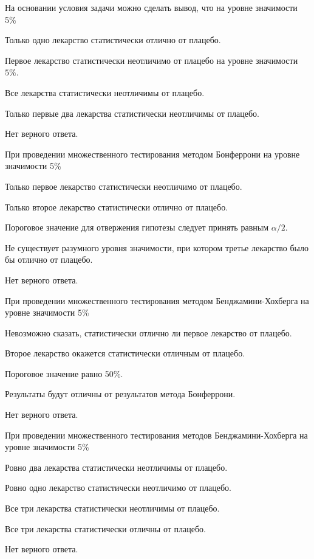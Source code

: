 \documentclass[10pt, a4paper]{exam}
\begin{document}
	\begin{questions}
		\question На основании условия задачи можно сделать вывод, что на уровне значимости 5\%
		\begin{choices}
			\item Только одно лекарство статистически отлично от плацебо.
			\item Первое лекарство статистически неотличимо от плацебо на уровне значимости $5\%$.
			\item Все лекарства статистически неотличимы от плацебо.
			\item Только первые два лекарства статистически неотличимы от плацебо.
			\item Нет верного ответа.
		\end{choices}
	
		\question При проведении множественного тестирования методом Бонферрони на уровне значимости 5\%
		\begin{choices}
			\item Только первое лекарство статистически неотличимо от плацебо.
			\item Только второе лекарство статистически отлично от плацебо.
			\item Пороговое значение для отвержения гипотезы следует принять равным $\alpha / 2$.
			\item Не существует разумного уровня значимости, при котором третье лекарство было бы отлично от плацебо.
			\item Нет верного ответа.
		\end{choices}
	
		\question При проведении множественного тестирования методом Бенджамини-Хохберга на уровне значимости 5\%
		\begin{choices}
			\item Невозможно сказать, статистически отлично ли первое лекарство от плацебо.
			\item Второе лекарство окажется статистически отличным от плацебо.
			\item Пороговое значение равно 50\%.
			\item Результаты будут отличны от результатов метода Бонферрони.
			\item Нет верного ответа.
		\end{choices}
	
		\question При проведении множественного тестирования методов Бенджамини-Хохберга на уровне значимости 5\%
		\begin{choices}
			\item Ровно два лекарства статистически неотличимы от плацебо.
			\item Ровно одно лекарство статистически неотличимо от плацебо.
			\item Все три лекарства статистически неотличимы от плацебо.
			\item Все три лекарства статистически отличны от плацебо.
			\item Нет верного ответа.
		\end{choices}
	\end{questions}
	
\end{document}
